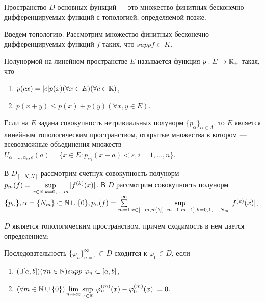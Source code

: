 \begin{Def}
	Пространство $D$ основных функций --- это множество финитных бесконечно дифференцируемых функций с топологией, определяемой позже.
\end{Def}

Введем топологию. Рассмотрим множество финитных бесконечно дифференцируемых функций $f$ таких, что $supp f\subset K$.

\begin{Def}
	Полунормой на линейном пространстве $E$ называется функция $p:E\to\mathbb{R}_+$ такая, что
	\begin{enumerate}
		\item $p(cx)=|c|p(x)(\forall x\in E)(\forall c\in \mathbb{R})$,
		\item $p(x+y)\leqslant p(x)+p(y)(\forall x,y\in E)$.
	\end{enumerate}
\end{Def}

\begin{prop}
	Если на $E$ задана совокупность нетривиальных полунорм $\{p_\alpha\}_{\alpha\in A}$, то $E$ является линейным топологическим пространством, открытые множества в котором --- всевозможные объединения множеств $U_{\alpha_1,\ldots,\alpha_n,\varepsilon}(a)=\{x\in E: p_{\alpha_i}(x-a)<\varepsilon, i=1,\ldots,n\}$.
\end{prop}

В $D_{[-N,N]}$ рассмотрим счетнух совокупность полунорм $p_m(f)=\sup\limits_{x\in\mathbb{R}, k=0,\ldots,m} |f^{(k)}(x)|$. В $D$ рассмотрим совокупность полунорм $\{p_\alpha\}, \alpha=\{N_m\}\subset\mathbb{N}\cup\{0\}, p_\alpha(f)=\sum\limits_{m=1}^\infty\sup\limits_{x\in[-m,m]\backslash[-m+1,m-1],k=0,1,\ldots, N_m}|f^{(k)}(x)|$.

$D$ является топологическим пространством, причем сходимость в нем дается определением:
\begin{Def}
	Последовательность $\{\varphi_n\}_{n=1}^\infty\subset D$ сходится к $\varphi_0\in D$, если 
	\begin{enumerate}
		\item $(\exists [a,b])(\forall n\in \N) supp\ \varphi_n\subset[a,b]$,
		\item $(\forall m\in \mathbb{N}\cup \{0\}) \lim\limits_{n\to\infty}\sup\limits_{x\in\mathbb{R}}|\varphi_n^{(m)}(x)-\varphi_0^{(m)}(x)|=0$.
	\end{enumerate}
\end{Def}

















